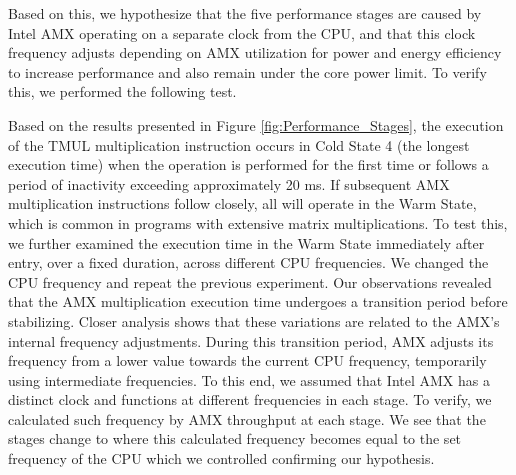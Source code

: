 
Based on this, we hypothesize that the five performance stages are caused by Intel AMX operating on a separate clock from the CPU, and that this clock frequency adjusts depending on AMX utilization for power and energy efficiency to increase performance and also remain under the core power limit. To verify this, we performed the following test.

Based on the results presented in Figure \ref{fig:Performance_Stages}, the execution of the TMUL multiplication instruction occurs in Cold State 4 (the longest execution time) when the operation is performed for the first time or follows a period of inactivity exceeding approximately 20 ms. If subsequent AMX multiplication instructions follow closely, all will operate in the Warm State, which is common in programs with extensive matrix multiplications.
%
To test this, we further examined the execution time in the Warm State immediately after entry, over a fixed duration, across different CPU frequencies. We changed the CPU frequency and repeat the previous experiment. 
Our observations revealed that the AMX multiplication execution time undergoes a transition period before stabilizing. Closer analysis shows that these variations are related to the AMX's internal frequency adjustments. During this transition period, AMX adjusts its frequency from a lower value towards the current CPU frequency, temporarily using intermediate frequencies. To this end, we assumed that Intel AMX has a distinct clock and functions at different frequencies in each stage. To verify, we calculated such frequency by AMX throughput at each stage. We see that the stages change to where this calculated frequency becomes equal to the set frequency of the CPU which we controlled confirming our hypothesis. 


